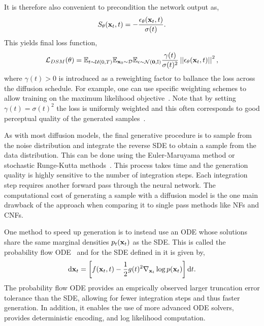 It is therefore also convenient to precondition the network output as,
\begin{equation}
    \label{eq:precondition}
    S_\theta(\mathbf{x}_t, t) = - \frac{\epsilon_\theta(\mathbf{x}_t, t)}{\sigma(t)}.
\end{equation}
This yields final loss function,
\begin{equation}
    \label{eq:denoising_loss}
    \mathcal{L}_{DSM}(\theta) =
    \mathbb{E}_{t \sim \mathcal{U}(0, T)}
    \mathbb{E}_{\mathbf{x}_0 \sim \mathcal{D}}
    \mathbb{E}_{\epsilon \sim \mathcal{N}(\mathbf{0}, \mathbb{I})}
    \frac{\gamma(t)}{\sigma(t)^2}
    \left|\left|\epsilon_\theta(\mathbf{x}_t, t)\right|\right|^2,
\end{equation}
where $\gamma(t) > 0$ is introduced as a reweighting factor to ballance the loss across the diffusion schedule.
For example, one can use specific weighting schemes to allow training on the maximum likelihood objective~\cite{UnderstandingDiffusionModels}.
Note that by setting $\gamma(t) = \sigma(t)^2$ the loss is uniformly weighted and this often corresponds to good perceptual quality of the generated samples~\cite{VariationalPerspectiveDiffusionBased, VariationalDiffusionModels, ImprovedDenoisingDiffusion}.

As with most diffusion models, the final generative procedure is to sample from the noise distribution and integrate the reverse SDE to obtain a sample from the data distribution.
This can be done using the Euler-Maruyama method or stochastic Runge-Kutta methods~\cite{StochasticRungeKutta}.
This process takes time and the generation quality is highly sensitive to the number of integration steps.
Each integration step requires another forward pass through the neural network.
The computational cost of generating a sample with a diffusion model is the one main drawback of the approach when comparing it to single pass methods like NFs and CNFs.

One method to speed up generation is to instead use an ODE whose solutions share the same marginal densities $p_t(\mathbf{x}_t)$ as the SDE.
This is called the probability flow ODE~\cite{ScoreBasedGenerativeModeling} and for the SDE defined in  it is given by,
\begin{equation}
    \label{eq:probability_flow}
    \mathrm{d} \mathbf{x}_t = \left[f(\mathbf{x}_t, t) - \frac{1}{2} g(t)^2 \nabla_{\mathbf{x}_t} \log p(\mathbf{x}_t)\right] \mathrm{d} t.
\end{equation}
The probability flow ODE provides an emprically observed larger truncation error tolerance than the SDE, allowing for fewer integration steps and thus faster generation.
In addition, it enables the use of more advanced ODE solvers, provides deterministic encoding, and log likelihood computation.

